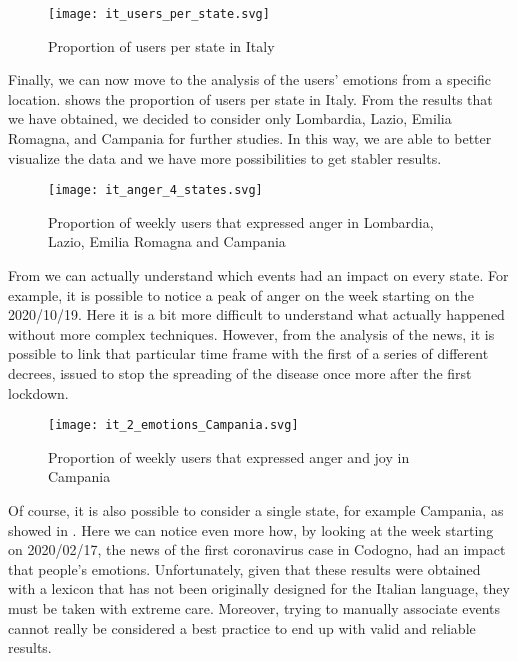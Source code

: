 \begin{figure}[H]
	\centering
    	\texttt{[image: it\_users\_per\_state.svg]}
    	\caption{Proportion of users per state in Italy}
    	\label{fig:it-users-state}
\end{figure}

Finally, we can now move to the analysis of the users' emotions from a specific location.  shows the proportion of users per state in Italy. From the results that we have obtained, we decided to consider only Lombardia, Lazio, Emilia Romagna, and Campania for further studies. In this way, we are able to better visualize the data and we have more possibilities to get stabler results. 

\begin{figure}[H]
	\centering
    	\texttt{[image: it\_anger\_4\_states.svg]}
    	\caption{Proportion of weekly users that expressed anger in Lombardia, Lazio, Emilia Romagna and Campania}
    	\label{fig:it-anger-4-states}
\end{figure}

From  we can actually understand which events had an impact on every state. For example, it is possible to notice a peak of anger on the week starting on the 2020/10/19. Here it is a bit more difficult to understand what actually happened without more complex techniques. However, from the analysis of the news, it is possible to link that particular time frame with the first of a series of different decrees, issued to stop the spreading of the disease once more after the first lockdown. 

\begin{figure}[H]
	\centering
    	\texttt{[image: it\_2\_emotions\_Campania.svg]}
    	\caption{Proportion of weekly users that expressed anger and joy in Campania}
    	\label{fig:it-2-emotions-campania}
\end{figure}

Of course, it is also possible to consider a single state, for example Campania, as showed in . Here we can notice even more how, by looking at the week starting on 2020/02/17, the news of the first coronavirus case in Codogno, had an impact that people's emotions. Unfortunately, given that these results were obtained with a lexicon that has not been originally designed for the Italian language, they must be taken with extreme care. Moreover, trying to manually associate events cannot really be considered a best practice to end up with valid and reliable results.